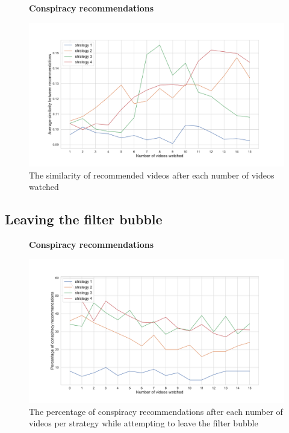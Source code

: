 \documentclass[../main.tex]{subfiles}
\begin{document}
\begin{figure}[ht]
  \textbf{Conspiracy recommendations}\par\medskip
  \centering
  \includegraphics[keepaspectratio, width=\textwidth]{images/similarity.pdf}
  \caption{The similarity of recommended videos after each number of videos watched}
  \label{fig:similarities}
\end{figure}

\subsection{Leaving the filter bubble}

\begin{figure}[!b]
  \textbf{Conspiracy recommendations}\par\medskip
  \centering
  \includegraphics[keepaspectratio, width=\textwidth]{images/conspiracy_recs_2.pdf}
  \caption{The percentage of conspiracy recommendations after each number of videos per strategy while attempting to leave the filter bubble}
  \label{fig:con_recs_2}
\end{figure}
\end{document}
